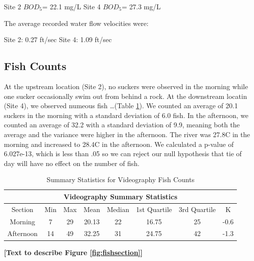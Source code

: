 \documentclass{article}\usepackage[]{graphicx}\usepackage[]{color}
\begin{document}
\subitem Site 2 $BOD_5$= 22.1 mg/L 
\subitem Site 4 $BOD_5$= 27.3 mg/L 

The average recorded water flow velocities were:

\subitem Site 2: 0.27 ft/sec
\subitem Site 4: 1.09 ft/sec 

\subsection{Fish Counts}



At the upstream location (Site 2), no suckers were observed in the morning while one sucker occasionally swim out from behind a rock. At the downstream locatin (Site 4), we observed numeous fish \ldots (Table \ref{tab:fishcounts}). We counted an average of 20.1 suckers in the morning with a standard deviation of 6.0 fish.  In the afternoon, we counted an average of 32.2 with a standard deviation of 9.9, meaning both the average and the variance were higher in the afternoon.  The river was 27.8\textdegree C in the morning and increased to 28.4\textdegree C in the afternoon.  We calculated a p-value of 6.027e-13, which is less than .05 so we can reject our null hypothesis that tie of day will have no effect on the number of fish.

\begin{table}
\caption{Summary Statistics for Videography Fish Counts}
\begin{tabular}{cccccccc}
 \hline
 \multicolumn{8}{c}{Videography Summary Statistics} \\
 \hline
 Section & Min & Max & Mean & Median & 1st Quartile & 3rd Quartile & K\\
 \hline
 Morning & 7 & 29 & 20.13 & 22  & 16.75 & 25 & -0.6\\
 Afternoon & 14 & 49 & 32.25 & 31 & 24.75 &  42 & -1.3\\
 \hline
\end{tabular}
\label{tab:fishcounts}
\end{table}

\textbf{[Text to describe Figure \ref{fig:fishsection}]}
\end{document}

